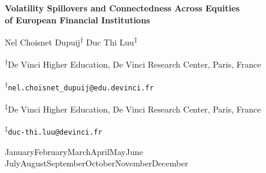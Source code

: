 \documentclass[12pt,a4paper]{article}
\newcommand{\monthyeardate}{%
  \ifcase\month\or
  January\or February\or March\or April\or May\or June\or
  July\or August\or September\or October\or November\or December\fi
  \space\number\year
}
\begin{document}

\begin{titlepage}
  \thispagestyle{empty}
  \begin{center}

    \vspace*{0.5cm}

    {\LARGE\bfseries Volatility Spillovers and Connectedness Across Equities\\[8pt]
    of European Financial Institutions\par}

    \vspace{1.8cm}

{\large
Nel Choisnet Dupuij\textsuperscript{$\dagger$}\quad
Duc Thi Luu\textsuperscript{$\ddagger$}\par}

\vspace{0.3cm}

{\normalsize
\textsuperscript{$\dagger$}De Vinci Higher Education, De Vinci Research Center, Paris, France\par
\textsuperscript{$\dagger$}\texttt{nel.choisnet\_dupuij@edu.devinci.fr}\par

\textsuperscript{$\ddagger$}De Vinci Higher Education, De Vinci Research Center, Paris, France\par
\textsuperscript{$\ddagger$}\texttt{duc-thi.luu@devinci.fr}
}

    \vfill

    {\normalsize\monthyeardate}

  \end{center}
  \restoregeometry
\end{titlepage}
\end{document}
